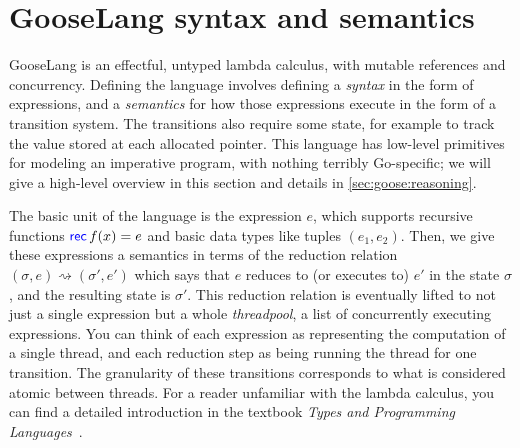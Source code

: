 \section{GooseLang syntax and semantics}%
\label{sec:goose:lang}

\newcommand{\goosedef}[1]{\mathsf{#1}}
\newcommand{\goosekw}[1]{\ensuremath{\goosedef{\textcolor{blue}{#1}}}}
\newcommand{\app}{\:}
\newcommand{\binop}{\circledcirc}
\newcommand{\unop}{\circleddash}

\newcommand{\external}{\mathsf{\textcolor{red}{\langle External \rangle}}}

\newcommand{\goosetrue}{\goosekw{true}}
\newcommand{\goosefalse}{\goosekw{false}}

\newcommand{\gooseif}[3]{\goosekw{if} \app #1 \app%
  \goosekw{then} \app #2 \app \goosekw{else} \app #3}

\newcommand{\recfx}{\goosekw{rec} \, f(x) = e}
\newcommand{\gooselambda}[1]{\goosekw{\lambda}#1.\,}

\newcommand{\reduces}{\rightsquigarrow}
\newcommand{\purereduction}{\overset{\mathrm{pure}}{\reduces}}

\newcommand{\seq}{;\,}
\newcommand{\defeq}{\triangleq}

GooseLang is an effectful, untyped lambda calculus, with mutable references and
concurrency. Defining the language involves defining a \emph{syntax} in the form
of expressions, and a \emph{semantics} for how those expressions execute in the
form of a transition system. The transitions also require some state, for
example to track the value stored at each allocated pointer. This language has
low-level primitives for modeling an imperative program, with nothing terribly
Go-specific; we will give a high-level overview in this section and details in
\cref{sec:goose:reasoning}.

The basic unit of the language is the expression $e$, which supports recursive
functions $\recfx$ and basic data types like tuples $(e_1, e_2)$. Then, we give
these expressions a semantics in terms of the reduction relation
$(\sigma, e) \reduces (\sigma', e')$ which says that $e$ reduces to (or executes
to) $e'$ in the state $\sigma$, and the resulting state is $\sigma'$. This
reduction relation is eventually lifted to not just a single expression but a
whole \emph{threadpool}, a list of concurrently executing expressions. You
can think of each expression as representing the computation of a single thread,
and each reduction step as being running the thread for one transition. The
granularity of these transitions corresponds to what is considered atomic
between threads. For a reader unfamiliar with the lambda calculus, you can find
a detailed introduction in the textbook \emph{Types and Programming
Languages}~\cite[Chapter~5]{pierce:tapl}.


